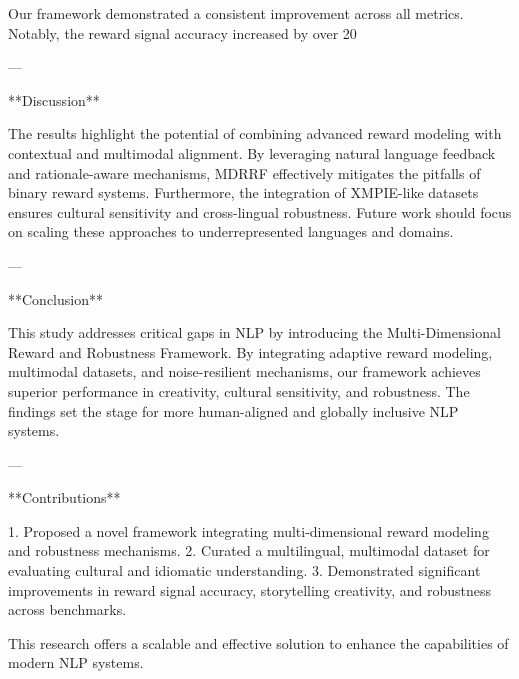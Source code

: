 Our framework demonstrated a consistent improvement across all metrics. Notably, the reward signal accuracy increased by over 20%

---

**Discussion**

The results highlight the potential of combining advanced reward modeling with contextual and multimodal alignment. By leveraging natural language feedback and rationale-aware mechanisms, MDRRF effectively mitigates the pitfalls of binary reward systems. Furthermore, the integration of XMPIE-like datasets ensures cultural sensitivity and cross-lingual robustness. Future work should focus on scaling these approaches to underrepresented languages and domains.

---

**Conclusion**

This study addresses critical gaps in NLP by introducing the Multi-Dimensional Reward and Robustness Framework. By integrating adaptive reward modeling, multimodal datasets, and noise-resilient mechanisms, our framework achieves superior performance in creativity, cultural sensitivity, and robustness. The findings set the stage for more human-aligned and globally inclusive NLP systems.

---

**Contributions**

1. Proposed a novel framework integrating multi-dimensional reward modeling and robustness mechanisms.
2. Curated a multilingual, multimodal dataset for evaluating cultural and idiomatic understanding.
3. Demonstrated significant improvements in reward signal accuracy, storytelling creativity, and robustness across benchmarks.

This research offers a scalable and effective solution to enhance the capabilities of modern NLP systems.